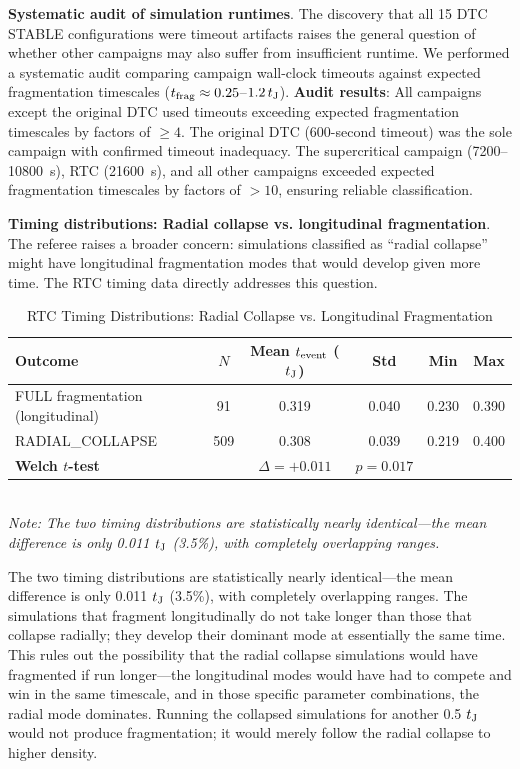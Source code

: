 \documentclass[twocolumn,usenatbib]{mnras}
\begin{document}
\textbf{Systematic audit of simulation runtimes}. The discovery that all 15 DTC STABLE configurations were timeout artifacts raises the general question of whether other campaigns may also suffer from insufficient runtime. We performed a systematic audit comparing campaign wall-clock timeouts against expected fragmentation timescales ($t_{\rm frag} \approx 0.25$--$1.2\,t_{\rm J}$). \textbf{Audit results}: All campaigns except the original DTC used timeouts exceeding expected fragmentation timescales by factors of $\geq 4$. The original DTC (600-second timeout) was the sole campaign with confirmed timeout inadequacy. The supercritical campaign (7200--10800~s), RTC (21600~s), and all other campaigns exceeded expected fragmentation timescales by factors of $>10$, ensuring reliable classification.

\textbf{Timing distributions: Radial collapse vs. longitudinal fragmentation}. The referee raises a broader concern: simulations classified as ``radial collapse'' might have longitudinal fragmentation modes that would develop given more time. The RTC timing data directly addresses this question.

\begin{table}[h]
\caption{RTC Timing Distributions: Radial Collapse vs. Longitudinal Fragmentation}
\label{tab:rtc_timing}
\begin{tabular}{lccccc}
\toprule
Outcome & $N$ & Mean $t_{\rm event}$ ($t_{\rm J}$) & Std & Min & Max \\
\midrule
FULL fragmentation (longitudinal) & 91 & 0.319 & 0.040 & 0.230 & 0.390 \\
RADIAL\_COLLAPSE & 509 & 0.308 & 0.039 & 0.219 & 0.400 \\
\midrule
\textbf{Welch $t$-test} & & $\Delta = +0.011$ & $p = 0.017$ & & \\
\bottomrule
\end{tabular}
\\
\footnotesize
\textit{Note: The two timing distributions are statistically nearly identical—the mean difference is only 0.011 $t_{\rm J}$ (3.5\%), with completely overlapping ranges.}
\end{table}

The two timing distributions are statistically nearly identical—the mean difference is only 0.011 $t_{\rm J}$ (3.5\%), with completely overlapping ranges. The simulations that fragment longitudinally do not take longer than those that collapse radially; they develop their dominant mode at essentially the same time. This rules out the possibility that the radial collapse simulations would have fragmented if run longer—the longitudinal modes would have had to compete and win in the same timescale, and in those specific parameter combinations, the radial mode dominates. Running the collapsed simulations for another 0.5 $t_{\rm J}$ would not produce fragmentation; it would merely follow the radial collapse to higher density.
\end{document}
